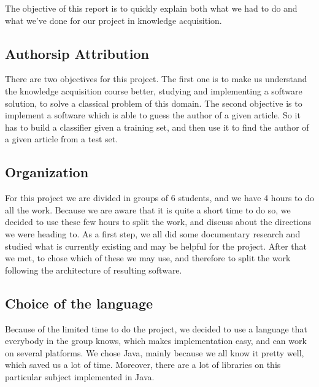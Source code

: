 The objective of this report is to quickly explain both what we had to do and what we've done for our project in knowledge acquisition. 

\subsection{Authorsip Attribution}

There are two objectives for this project. The first one is to make us understand the knowledge acquisition course better, studying and implementing a software solution, to solve a classical problem of this domain. The second objective is to implement a software which is able to guess the author of a given article. So it has to build a classifier given a training set, and then use it to find the author of a given article from a test set.

\subsection{Organization}

For this project we are divided in groups of 6 students, and we have 4 hours to do all the work. Because we are aware that it is quite a short time to do so, we decided to use these few hours to split the work, and discuss about the directions we were heading to. 
As a first step, we all did some documentary research and studied what is currently existing and may be helpful for the project. After that we met, to chose which of these we may use, and therefore to split the work following the architecture of resulting software.

\subsection{Choice of the language}

Because of the limited time to do the project, we decided to use a language that everybody in the group knows, which makes implementation easy, and can work on several platforms. We chose Java, mainly because we all know it pretty well, which saved us a lot of time. Moreover, there are a lot of libraries on this particular subject implemented in Java.